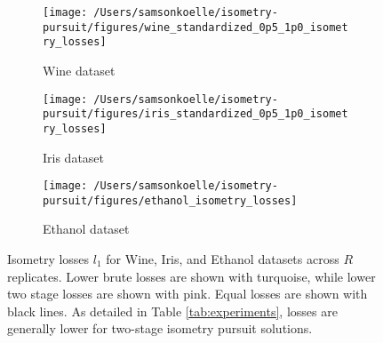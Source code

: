 \begin{figure}[t]
    \centering
    \begin{subfigure}[b]{0.3\textwidth}
        \centering
        \texttt{[image: /Users/samsonkoelle/isometry-pursuit/figures/wine\_standardized\_0p5\_1p0\_isometry\_losses]}
        \caption{Wine dataset}
        \label{fig:wine_isometry_losses}
    \end{subfigure}
    \hfill
    \begin{subfigure}[b]{0.3\textwidth}
        \centering
        \texttt{[image: /Users/samsonkoelle/isometry-pursuit/figures/iris\_standardized\_0p5\_1p0\_isometry\_losses]}
        \caption{Iris dataset}
        \label{fig:iris_isometry_losses}
    \end{subfigure}
    \hfill
    \begin{subfigure}[b]{0.3\textwidth}
        \centering
        \texttt{[image: /Users/samsonkoelle/isometry-pursuit/figures/ethanol\_isometry\_losses]}
        \caption{Ethanol dataset}
        \label{fig:ethanol_isometry_losses}
    \end{subfigure}
    \caption{Isometry losses $l_1$  for Wine, Iris, and Ethanol datasets across $R$ replicates.
    Lower brute losses are shown with turquoise, while lower two stage losses are shown with pink.
    Equal losses are shown with black lines.
    As detailed in Table \ref{tab:experiments}, losses are generally lower for two-stage isometry pursuit solutions.}
    \label{fig:isometry_losses}
\end{figure}
